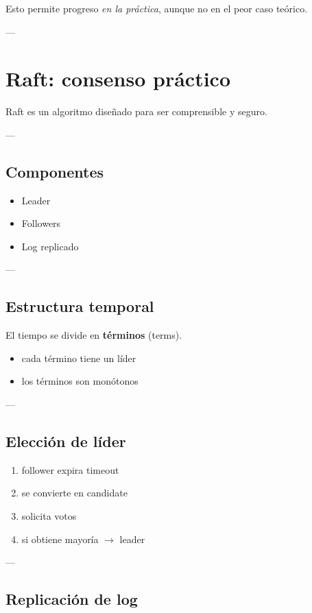 \documentclass[variant=apuntes,cover=institutional,mode=screen]{ua-engineering-v6-article}
\begin{document}
Esto permite progreso \emph{en la práctica}, aunque no en el peor caso teórico.

---

\section{Raft: consenso práctico}

Raft es un algoritmo diseñado para ser comprensible y seguro.

---

\subsection{Componentes}

\begin{itemize}
\item Leader
\item Followers
\item Log replicado
\end{itemize}

---

\subsection{Estructura temporal}

El tiempo se divide en \textbf{términos} (terms).

\begin{itemize}
\item cada término tiene un líder
\item los términos son monótonos
\end{itemize}

---

\subsection{Elección de líder}

\begin{enumerate}
\item follower expira timeout
\item se convierte en candidate
\item solicita votos
\item si obtiene mayoría $\to$ leader
\end{enumerate}

---

\subsection{Replicación de log}
\end{document}
